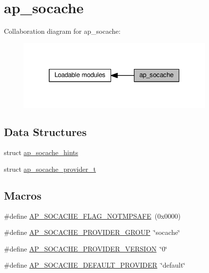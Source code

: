 \hypertarget{group__AP__SOCACHE}{}\section{ap\+\_\+socache}
\label{group__AP__SOCACHE}
Collaboration diagram for ap\+\_\+socache\+:
\nopagebreak
\begin{figure}[H]
\begin{center}
\leavevmode
\includegraphics[width=280pt]{group__AP__SOCACHE}
\end{center}
\end{figure}
\subsection*{Data Structures}
\begin{DoxyCompactItemize}
\item 
struct \hyperlink{structap__socache__hints}{ap\+\_\+socache\+\_\+hints}
\item 
struct \hyperlink{structap__socache__provider__t}{ap\+\_\+socache\+\_\+provider\+\_\+t}
\end{DoxyCompactItemize}
\subsection*{Macros}
\begin{DoxyCompactItemize}
\item 
\#define \hyperlink{group__AP__SOCACHE_ga770558b0e3bdd232891e4bdbd6a04534}{A\+P\+\_\+\+S\+O\+C\+A\+C\+H\+E\+\_\+\+F\+L\+A\+G\+\_\+\+N\+O\+T\+M\+P\+S\+A\+FE}~(0x0000)
\item 
\#define \hyperlink{group__AP__SOCACHE_ga4a0deb72eb377ff31cf33b692dc4375b}{A\+P\+\_\+\+S\+O\+C\+A\+C\+H\+E\+\_\+\+P\+R\+O\+V\+I\+D\+E\+R\+\_\+\+G\+R\+O\+UP}~\char`\"{}socache\char`\"{}
\item 
\#define \hyperlink{group__AP__SOCACHE_gac8fa414096ef7bb571ddb30611c8824a}{A\+P\+\_\+\+S\+O\+C\+A\+C\+H\+E\+\_\+\+P\+R\+O\+V\+I\+D\+E\+R\+\_\+\+V\+E\+R\+S\+I\+ON}~\char`\"{}0\char`\"{}
\item 
\#define \hyperlink{group__AP__SOCACHE_ga12c4c3d0a2402bd99628671a29fb33ae}{A\+P\+\_\+\+S\+O\+C\+A\+C\+H\+E\+\_\+\+D\+E\+F\+A\+U\+L\+T\+\_\+\+P\+R\+O\+V\+I\+D\+ER}~\char`\"{}default\char`\"{}
\end{DoxyCompactItemize}
